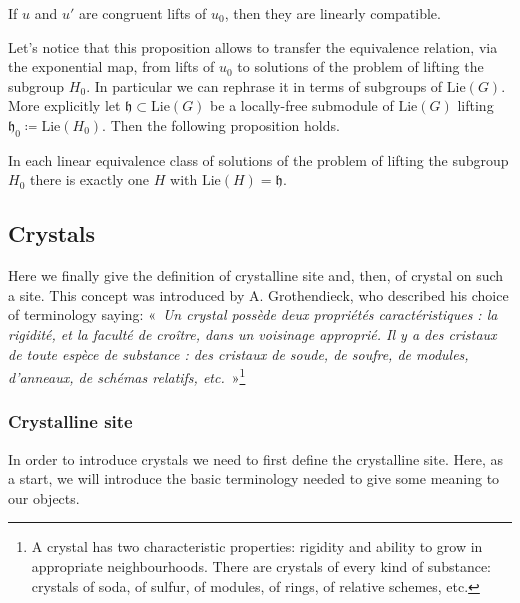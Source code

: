 \begin{lem}\label{lem:CongruentLinComp}
	If $u$ and $u'$ are congruent lifts of $u_0$, then
	they are linearly compatible.
\end{lem} 


\begin{rem}[]
	Let's notice that this proposition allows to
	transfer the equivalence relation, via the exponential map,
	from lifts of $u_0$ to solutions of the problem of lifting
	the subgroup $H_0$.
	In particular we can rephrase it in terms of subgroups
	of $\mathrm{Lie}(G)$. More explicitly
	let $\mathfrak{h} \subset \mathrm{Lie}(G)$ be a locally-free
	submodule of $\mathrm{Lie}(G)$ lifting
	$\mathfrak{h}_0 \coloneqq \mathrm{Lie}(H_0)$.
	Then the following proposition holds.
\end{rem}


\begin{prop}\label{prop:equivClassFiltration}
	In each linear equivalence class of solutions of
	the problem of lifting the subgroup $H_0$
	there is exactly one $H$ with 
	$\mathrm{Lie}(H) = \mathfrak{h}$.
\end{prop}



\subsection{Crystals}
Here we finally give the definition of crystalline site and, then, of
crystal on such a site.
This concept was introduced by A. Grothendieck, 
who described his choice of terminology saying:
«~{\em Un crystal possède deux propriétés caractéristiques : la rigidité, 
et la faculté de croître, dans un voisinage approprié. 
Il y a des cristaux de toute espèce de substance : des cristaux de soude, 
de soufre, de modules, d'anneaux, de schémas relatifs, etc.}~»\footnote{A
crystal has two characteristic properties: rigidity and ability to grow
in appropriate neighbourhoods.
There are crystals of every kind of substance: crystals of soda, of sulfur,
of modules, of rings, of relative schemes, etc.}



\subsubsection{Crystalline site}
In order to introduce crystals we need to first define the crystalline site.
Here, as a start, we will introduce the basic terminology needed to give
some meaning to our objects.


